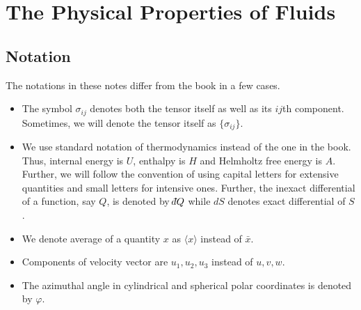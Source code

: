 \chapter{The Physical Properties of Fluids}\label{c1}
\section{Notation}
The notations in these notes differ from the book in a few cases.
\begin{itemize}
\item The symbol $\sigma_{ij}$ denotes both the tensor itself as well as its $ij$th component. Sometimes, we will denote the tensor itself as $\{\sigma_{ij}\}$.

\item We use standard notation of thermodynamics instead of the one in the book. Thus, internal energy is $U$, enthalpy is $H$ and Helmholtz free energy is $A$. Further, we will follow 
the convention of using capital letters for extensive quantities and small letters for intensive ones. Further, the inexact differential of a function, say $Q$, is denoted by $\dbar Q$ 
while $dS$ denotes exact differential of $S$.

\item We denote average of a quantity $x$ as $\langle x \rangle$ instead of $\bar{x}$.

\item Components of velocity vector are $u_1, u_2, u_3$ instead of $u, v, w$.

\item The azimuthal angle in cylindrical and spherical polar coordinates is denoted by $\varphi$.

\end{itemize}

